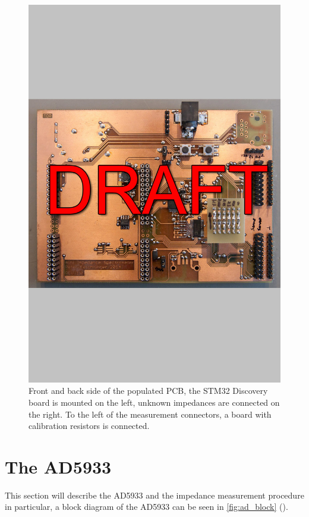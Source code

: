\begin{figure}[htpb]
  \centering
    \includegraphics[width=\textwidth]{bilder/pcb_frontback.jpg}
  \caption{Front and back side of the populated PCB, the STM32 Discovery board is mounted on the left, unknown
    impedances are connected on the right. To the left of the measurement connectors, a board with calibration
    resistors is connected.}
  \label{fig:pcb_frontback}
\end{figure}


\section{The AD5933}

This section will describe the AD5933 and the impedance measurement procedure in particular, a block diagram of the
AD5933 can be seen in \autoref{fig:ad_block} ().

